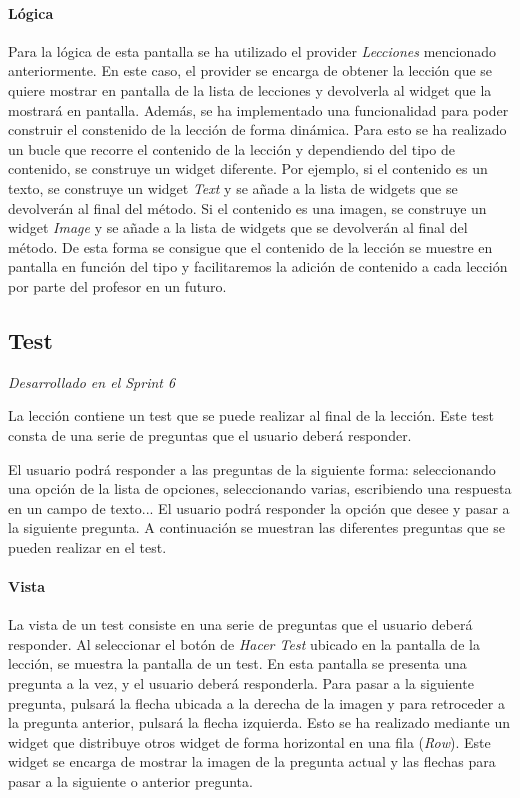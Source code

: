 \paragraph*{Lógica}
Para la lógica de esta pantalla se ha utilizado el provider \textit{Lecciones} mencionado anteriormente. En este caso, el provider se encarga 
de obtener la lección que se quiere mostrar en pantalla de la lista de lecciones y devolverla al widget que la mostrará en pantalla.
Además, se ha implementado una funcionalidad para poder construir el constenido de la lección de forma dinámica.
 Para esto se ha realizado un bucle que recorre el contenido de la lección y dependiendo del tipo de contenido, se construye un widget diferente. 
 Por ejemplo, si el contenido es un texto, se construye un widget \textit{Text} y se añade a la lista de widgets que se devolverán al final del método. 
 Si el contenido es una imagen, se construye un widget \textit{Image} y se añade a la lista de widgets que se devolverán al final del método. De esta forma 
se consigue que el contenido de la lección se muestre en pantalla en función del tipo y facilitaremos la adición de contenido a cada lección por parte del profesor en un futuro.

\subsection{Test}
\label{sec:test}
\textit{Desarrollado en el Sprint 6}

La lección contiene un test que se puede realizar al final de la lección. Este test consta de una serie de preguntas que el usuario deberá responder.

El usuario podrá responder a las preguntas de la siguiente forma: seleccionando una opción de la lista de opciones, seleccionando varias, 
escribiendo una respuesta en un campo de texto... El usuario podrá responder la opción que desee y pasar a la siguiente pregunta.
 A continuación se muestran las diferentes preguntas que se pueden realizar en el test.


\paragraph*{Vista}
La vista de un test consiste en una serie de preguntas que el usuario deberá responder. Al seleccionar el botón de \textit{Hacer Test} 
ubicado en la pantalla de la lección, se muestra la pantalla de un test. En esta pantalla se presenta una pregunta a la vez, y el usuario deberá responderla. 
Para pasar a la siguiente pregunta, pulsará la flecha ubicada a la derecha de la imagen y para retroceder a la pregunta anterior, pulsará la flecha izquierda.
Esto se ha realizado mediante un widget que distribuye otros widget de forma horizontal en una fila (\textit{Row}). 
Este widget se encarga de mostrar la imagen de la pregunta actual y las flechas para pasar a la siguiente o anterior pregunta.

